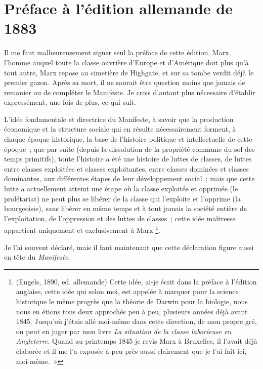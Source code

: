 \documentclass[french,twoside]{book} %
\newcommand{\byline}[1]{\bigskip{\RaggedLeft{#1}\par}\bigskip}
\begin{document}
\section[Préface à l’édition allemande de 1883]{Préface à l’édition allemande de 1883}
\noindent Il me faut malheureusement signer seul la préface de cette édition. Marx, l’homme auquel toute la classe ouvrière d’Europe et d’Amérique doit plus qu’à tout autre, Marx repose au cimetière de Highgate, et sur sa tombe verdit déjà le premier gazon. Après sa mort, il ne saurait être question moins que jamais de remanier ou de compléter le Manifeste. Je crois d’autant plus nécessaire d’établir expressément, une fois de plus, ce qui suit.\par
L'idée fondamentale et directrice du Manifeste, à savoir que la production économique et la structure sociale qui en résulte nécessairement forment, à chaque époque historique, la base de l’histoire politique et intellectuelle de cette époque ; que par suite (depuis la dissolution de la propriété commune du sol des temps primitifs), toute l’histoire a été une histoire de luttes de classes, de luttes entre classes exploitées et classes exploitantes, entre classes dominées et classes dominantes, aux différentes étapes de leur développement social ; mais que cette lutte a actuellement atteint une étape où la classe exploitée et opprimée (le prolétariat) ne peut plus se libérer de la classe qui l’exploite et l’opprime (la bourgeoisie), sans libérer en même temps et à tout jamais la société entière de l’exploitation, de l’oppression et des luttes de classes ; cette idée maîtresse appartient uniquement et exclusivement à Marx \footnote{ \noindent (Engels, 1890, ed. allemande) Cette idée, ai-je écrit dans la préface à l’édition anglaise, cette idée qui selon moi, est appelée à marquer pour la science historique le même progrès que la théorie de Darwin pour la biologie, nous nous en étions tous deux approchés peu à peu, plusieurs années déjà avant 1845. Jusqu’où j’étais allé moi-même dans cette direction, de mon propre gré, on peut en juger par mon livre \emph{La situation de la classe laborieuse en Angleterre}. Quand au printemps 1845 je revis Marx à Bruxelles, il l’avait déjà élaborée et il me l’a exposée à peu près aussi clairement que je l’ai fait ici, moi-même. »
 }.\par
Je l’ai souvent déclaré, mais il faut maintenant que cette déclaration figure aussi en tête du \emph{Manifeste}.\par

\byline{Friedrich Engels ; \\
Londres, 28 juin 1883}
\end{document}
